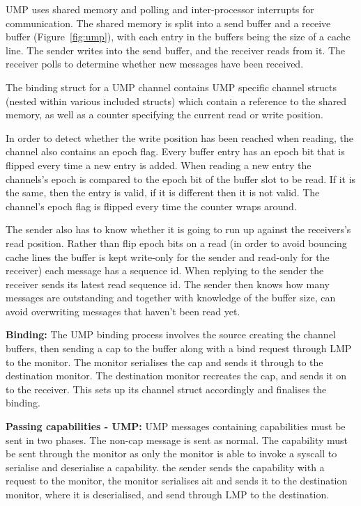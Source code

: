 \documentclass[a4paper,twoside]{report} %
\begin{document}
UMP uses shared memory and polling and inter-processor interrupts for
communication. The shared memory is split into a send buffer and a receive
buffer (Figure~\ref{fig:ump}), with each entry in the buffers being the size of
a cache line. The sender writes into the send buffer, and the receiver reads
from it. The receiver polls to determine whether new messages have been
received.

The binding struct for a UMP channel contains UMP specific channel structs
(nested within various included structs) which contain a reference to the shared
memory, as well as a counter specifying the current read or write position.

In order to detect whether the write position has been reached when reading, the
channel also contains an epoch flag. Every buffer entry has an epoch bit that is
flipped every time a new entry is added. When reading a new entry the channels's
epoch is compared to the epoch bit of the buffer slot to be read. If it is the
same, then the entry is valid, if it is different then it is not valid. The
channel's epoch flag is flipped every time the counter wraps around.

The sender also has to know whether it is going to run up against the
receivers's read position. Rather than flip epoch bits on a read (in order to
avoid bouncing cache lines the buffer is kept write-only for the sender and
read-only for the receiver) each message has a sequence id. When replying to the
sender the receiver sends its latest read sequence id. The sender then knows how
many messages are outstanding and together with knowledge of the buffer size,
can avoid overwriting messages that haven't been read yet.

\textbf{Binding:} The UMP binding process involves the source creating the
channel buffers, then sending a cap to the buffer along with a bind request
through LMP to the monitor. The monitor serialises the cap and sends it through
to the destination monitor. The destination monitor recreates the cap, and sends
it on to the receiver. This sets up its channel struct accordingly and finalises
the binding.

\textbf{Passing capabilities - UMP:} UMP messages containing capabilities must
be sent in two phases. The non-cap message is sent as normal. The capability
must be sent through the monitor as only the monitor is able to invoke a syscall
to serialise and deserialise a capability. the sender sends the capability with
a request to the monitor, the monitor serialises ait and sends it to the
destination monitor, where it is deserialised, and send through LMP to the
destination.





\end{document}
